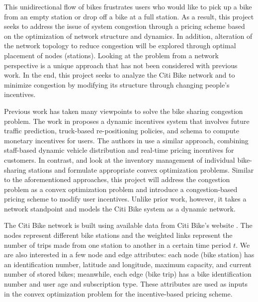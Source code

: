 \documentclass[times, 10pt,twocolumn]{article}
\begin{document}
This unidirectional flow of bikes frustrates users who would like to pick up a bike from an empty station or drop off a bike at a full station. As a result, this project seeks to address the issue of system congestion through a pricing scheme based on the optimization of network structure and dynamics. In addition, alteration of the network topology to reduce congestion will be explored through optimal placement of nodes (stations). Looking at the problem from a network perspective is a unique approach that has not been considered with previous work. In the end, this project seeks to analyze the Citi Bike network and to minimize congestion by modifying its structure through changing people's incentives.


Previous work has taken many viewpoints to solve the bike sharing congestion problem. The work in \cite{incentives} proposes a dynamic incentives system that involves future traffic prediction, truck-based re-positioning policies, and schema to compute monetary incentives for users. The authors in \cite{redistribution} use a similar approach, combining staff-based dynamic vehicle distribution and real-time pricing incentives for customers. In contrast, \cite{management} and \cite{redistribution} look at the inventory management of individual bike-sharing stations and formulate appropriate convex optimization problems. Similar to the aforementioned approaches, this project will address the congestion problem as a convex optimization problem and introduce a congestion-based pricing scheme to modify user incentives. Unlike prior work, however, it takes a network standpoint and models the Citi Bike system as a dynamic network.


The Citi Bike network is built using available data from Citi Bike's website \cite{dataset}. The nodes represent different bike stations and the weighted links represent the number of trips made from one station to another in a certain time period $t$. We are also interested in a few node and edge attributes: each node (bike station) has an identification number, latitude and longitude, maximum capacity, and current number of stored bikes; meanwhile, each edge (bike trip) has a bike identification number and user age and subscription type. These attributes are used as inputs in the convex optimization problem for the incentive-based pricing scheme.
\end{document}
